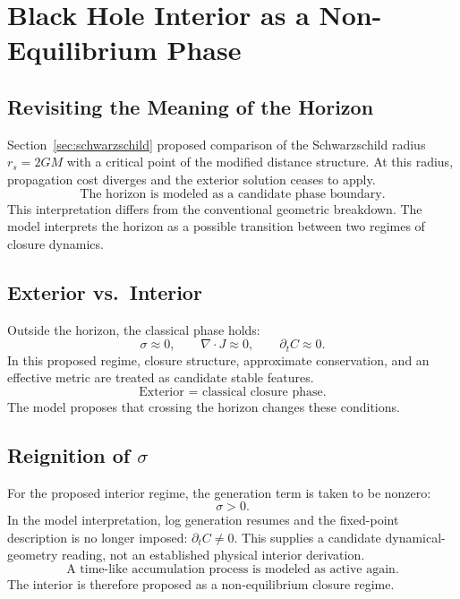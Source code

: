 \section{Black Hole Interior as a Non-Equilibrium Phase}
\label{sec:black_hole}

\subsection{Revisiting the Meaning of the Horizon}

Section~\ref{sec:schwarzschild} proposed comparison of the Schwarzschild radius
$r_s=2GM$ with a critical point of the modified distance structure.
At this radius, propagation cost diverges and the exterior solution ceases to apply.
\begin{equation}
  \boxed{\text{The horizon is modeled as a candidate phase boundary.}}
\end{equation}
This interpretation differs from the conventional geometric breakdown.
The model interprets the horizon as a possible transition between two regimes
of closure dynamics.

\subsection{Exterior vs.\ Interior}

Outside the horizon, the classical phase holds:
\begin{equation}
  \sigma \approx 0, \qquad \nabla \cdot J \approx 0, \qquad \partial_t C \approx 0.
\end{equation}
In this proposed regime, closure structure, approximate conservation, and an
effective metric are treated as candidate stable features.
\begin{equation}
  \boxed{\text{Exterior = classical closure phase.}}
\end{equation}
The model proposes that crossing the horizon changes these conditions.

\subsection{Reignition of $\sigma$}

For the proposed interior regime, the generation term is taken to be nonzero:
\begin{equation}
  \boxed{\sigma > 0.}
\end{equation}
In the model interpretation, log generation resumes and the fixed-point
description is no longer imposed: $\partial_t C\neq0$. This supplies a
candidate dynamical-geometry reading, not an established physical interior
derivation.
\begin{equation}
  \boxed{\text{A time-like accumulation process is modeled as active again.}}
\end{equation}
The interior is therefore proposed as a non-equilibrium closure regime.


